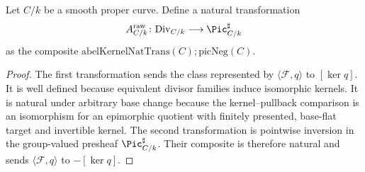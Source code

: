 \begin{definition}\leanok
  \label{def:abel_map_witness}
  Let \(C/k\) be a smooth proper curve. Define a
  natural transformation
  \[
    A^{\mathrm{raw}}_{C/k} \colon \mathrm{Div}_{C/k}
      \longrightarrow \Pic^\sharp_{C/k}
  \]
  as the composite
  \(
    \mathrm{abelKernelNatTrans}(C)
    \mathbin{;} \mathrm{picNeg}(C)
  \).
\end{definition}

\begin{proof}\leanok
  The first transformation sends the class represented by
  \(\langle \mathcal F,q\rangle\) to \([\ker q]\). It is well defined because
  equivalent divisor families induce isomorphic kernels. It is natural under
  arbitrary base change because the kernel--pullback comparison is an
  isomorphism for an epimorphic quotient with finitely presented, base-flat
  target and invertible kernel. The second transformation is pointwise
  inversion in the group-valued presheaf \(\Pic^\sharp_{C/k}\). Their composite
  is therefore natural and sends
  \(\langle \mathcal F,q\rangle\) to \(-[\ker q]\).
\end{proof}


